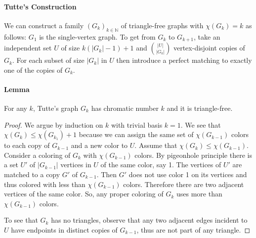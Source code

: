 \paragraph{Tutte's Construction}
We can construct a family $(G_k)_{k\in\mathbb{N}}$ of triangle-free graphs 
with $\chi(G_k) = k$ as follows: $G_1$ is the single-vertex graph. To get 
from $G_k$ to $G_{k+1}$, take an independent set $U$ of size 
$k(|G_k| -1) +1$ and $\binom{|U|}{|G_k|}$ vertex-disjoint copies of $G_k$. 
For each subset of size $|G_k|$ in $U$ then introduce a perfect matching to 
exactly one of the copies of $G_k$.

\paragraph{Lemma} For any $k$, Tutte's graph $G_k$ has chromatic number $k$ and
it is triangle-free.
\begin{proof}
    We argue by induction on $k$ with trivial basis $k=1$. We see that 
    $\chi(G_k) \leq \chi(G_{k_1})+1$ because we can assign the same set of 
    $\chi(G_{k-1})$ colors to each copy of $G_{k-1}$ and a new color to $U$.
    Assume that $\chi(G_k) \leq \chi(G_{k-1})$. Consider a coloring of $G_k$
    with $\chi(G_{k-1})$ colors. By pigeonhole principle there is a set $U'$
    of $|G_{k-1}|$ vertices in $U$ of the same color, say 1. The vertices of 
    $U'$ are matched to a copy $G'$ of $G_{k-1}$. Then $G'$ does not use color 
    1 on its vertices and thus colored with less than $\chi(G_{k-1})$ colors.
    Therefore there are two adjacent vertices of the same color. So, any 
    proper coloring of $G_k$ uses more than $\chi(G_{k-1})$ colors.

    \bigskip
    To see that $G_k$ has no triangles, observe that any two adjacent edges 
    incident to $U$ have endpoints in distinct copies of $G_{k-1}$, thus are 
    not part of any triangle.
\end{proof}


